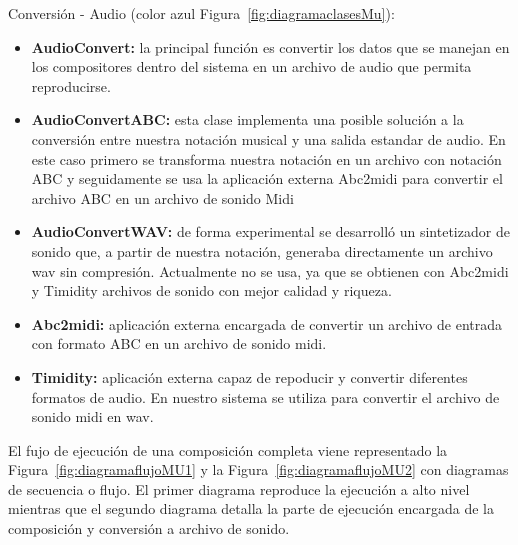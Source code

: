 Conversión - Audio (color azul Figura~\ref{fig:diagramaclasesMu}):

\begin{itemize}
	
	\item \textbf{AudioConvert:} la principal función es convertir los datos que se manejan en los compositores dentro del sistema en un archivo de audio que permita reproducirse.

	\item \textbf{AudioConvertABC:} esta clase implementa una posible solución a la conversión entre nuestra notación musical y una salida estandar de audio. En este caso primero se transforma nuestra notación en un archivo con notación ABC y seguidamente se usa la aplicación externa Abc2midi para convertir el archivo ABC en un archivo de sonido Midi

	\item \textbf{AudioConvertWAV:} de forma experimental se desarrolló un sintetizador de sonido que, a partir de nuestra notación, generaba directamente un archivo wav sin compresión. Actualmente no se usa, ya que se obtienen con Abc2midi y Timidity archivos de sonido con mejor calidad y riqueza.

	\item \textbf{Abc2midi:} aplicación externa encargada de convertir un archivo de entrada con formato ABC en un archivo de sonido midi.

	\item \textbf{Timidity:} aplicación externa capaz de repoducir y convertir diferentes formatos de audio. En nuestro sistema se utiliza para convertir el archivo de sonido midi en wav.

\end{itemize}
	
El fujo de ejecución de una composición completa viene representado la Figura~\ref{fig:diagramaflujoMU1} y la Figura~\ref{fig:diagramaflujoMU2} con diagramas de secuencia o flujo. El primer diagrama reproduce la ejecución a alto nivel mientras que el segundo diagrama detalla la parte de ejecución encargada de la composición y conversión a archivo de sonido.

